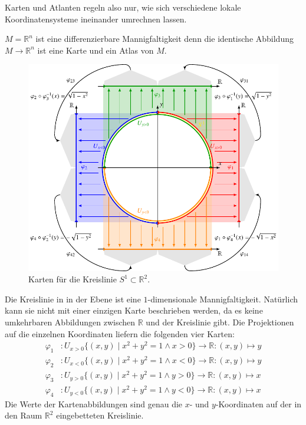 Karten und Atlanten regeln also nur, wie sich verschiedene lokale
Koordinatensysteme ineinander umrechnen lassen.

\begin{beispiel}
$M=\mathbb{R}^n$ ist eine differenzierbare Mannigfaltigkeit denn 
die identische Abbildung $M\to \mathbb{R}^n$ ist eine Karte und ein
Atlas von $M$.
\end{beispiel}

\begin{beispiel}
\begin{figure}
\centering
\includegraphics{chapters/60-gruppen/images/kartenkreis.pdf}
\caption{Karten für die Kreislinie $S^1\subset\mathbb{R}^2$.
\label{buch:gruppen:fig:kartenkreis}}
\end{figure}
Die Kreislinie in in der Ebene ist eine $1$-dimensionale Mannigfaltigkeit.
Natürlich kann sie nicht mit einer einzigen Karte beschrieben werden,
da es keine umkehrbaren Abbildungen zwischen $\mathbb{R}$ und der Kreislinie
gibt.
Die Projektionen auf die einzelnen Koordinaten liefern die folgenden
vier Karten:
\begin{align*}
\varphi_1&\colon U_{x>0}\{(x,y)\;|\;x^2+y^2=1\wedge x>0\} \to\mathbb{R}
:
(x,y) \mapsto y
\\
\varphi_2&\colon U_{x<0}\{(x,y)\;|\;x^2+y^2=1\wedge x<0\} \to\mathbb{R}
:
(x,y) \mapsto y
\\
\varphi_3&\colon U_{y>0}\{(x,y)\;|\;x^2+y^2=1\wedge y>0\} \to\mathbb{R}
:
(x,y) \mapsto x
\\
\varphi_4&\colon U_{y<0}\{(x,y)\;|\;x^2+y^2=1\wedge y<0\} \to\mathbb{R}
:
(x,y) \mapsto x
\end{align*}
Die Werte der Kartenabbildungen sind genau die $x$- und $y$-Koordinaten
auf der in den Raum $\mathbb{R}^2$ eingebetteten Kreislinie.


\end{beispiel}
